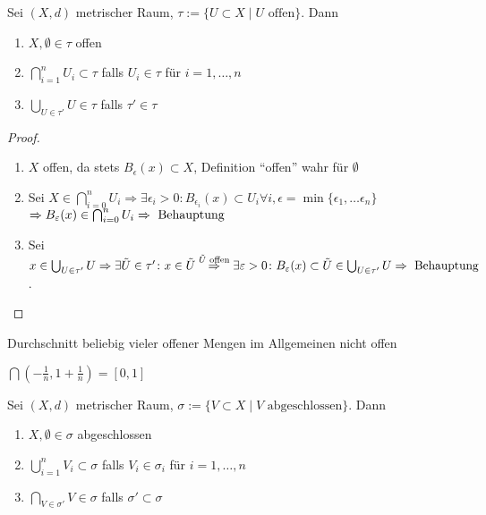 \begin{proposition}\label{proposition_topologie}
	Sei $(X,d)$ metrischer Raum, $\tau:=\{U\subset X \mid U \text{ offen}\}$. Dann
	\begin{enumerate}[label={\arabic*)}]
		\item \label{topologie_1} $X,\emptyset\in \tau$ offen
		\item \label{topologie_2} $\bigcap_{i=1}^n U_i\subset \tau$ falls $U_i\in\tau$ für $i=1,\dotsc,n$
		\item \label{topologie_3} $\bigcup_{U\in\tau'} U\in\tau$ falls $\tau'\in\tau$ 
	\end{enumerate}
\end{proposition}
\begin{proof}
	\begin{enumerate}[label={\arabic*)}]
		\item $X$ offen, da stets $B_{\epsilon}(x) \subset X$, Definition ``offen'' wahr für $\emptyset$
		\item Sei $X \in \bigcap_{i=0}^{n} U_i \Rightarrow \exists \epsilon_i > 0 \colon B_{\epsilon_i}(x) \subset U_i \forall i, \epsilon = \min\{\epsilon_1, \dots \epsilon_n\}$\\
		$\Rightarrow B_{\varepsilon}(x) \in \bigcap_{i=0}^{n} U_i \Rightarrow \text{ Behauptung}$
		\item Sei $x \in \bigcup_{U\in\tau^{\prime}} U \Rightarrow \exists \tilde{U}\in \tau^{\prime}\colon x \in \tilde{U} \overset{\tilde{U} \text{ offen}}{\Rightarrow}\exists \varepsilon > 0 \colon B_{\varepsilon}(x) \subset \tilde{U} \in \bigcup_{U\in\tau^{\prime}} U \Rightarrow \text{ Behauptung}$.
	\end{enumerate}
\end{proof}

\begin{underlinedenvironment}[Hinweis]
	Durchschnitt beliebig vieler offener Mengen im Allgemeinen nicht offen \\
\end{underlinedenvironment}

\begin{example}
	$\bigcap (-\frac{1}{n},1+\frac{1}{n})=[0,1]$
\end{example}

\begin{conclusion}
	Sei $(X,d)$ metrischer Raum, $\sigma :=\{ V\subset X \mid  V \text{ abgeschlossen}\}$. Dann
	\begin{enumerate}[label={\arabic*)}]
		\item $X,\emptyset \in \sigma$ abgeschlossen
		\item $\bigcup_{i=1}^n V_i\subset\sigma$ falls $V_i\in\sigma_i$ für $i=1,\dotsc, n$
		\item $\bigcap_{V\in\sigma'} V\in\sigma$ falls $\sigma'\subset\sigma$
	\end{enumerate}
\end{conclusion}

